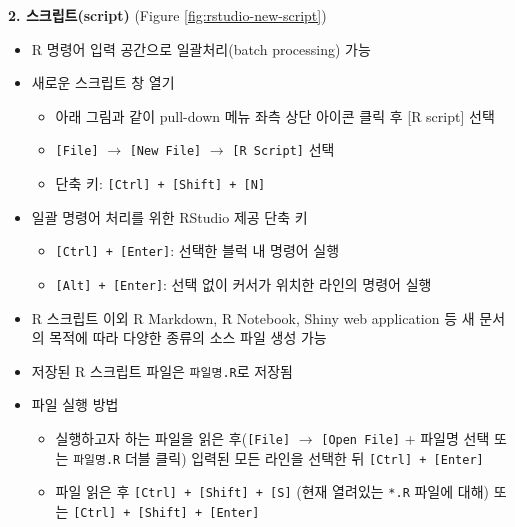 \documentclass[
  11pt,
]{krantz}
\providecommand{\tightlist}{%
  \setlength{\itemsep}{0pt}\setlength{\parskip}{0pt}}
\begin{document}
\normalsize

\textbf{2. 스크립트(script)} (Figure \ref{fig:rstudio-new-script})

\begin{itemize}
\tightlist
\item
  R 명령어 입력 공간으로 일괄처리(batch processing) 가능
\item
  새로운 스크립트 창 열기

  \begin{itemize}
  \tightlist
  \item
    아래 그림과 같이 pull-down 메뉴 좌측 상단 아이콘 클릭 후 {[}R script{]} 선택
  \item
    \texttt{{[}File{]}} \(\rightarrow\) \texttt{{[}New\ File{]}} \(\rightarrow\) \texttt{{[}R\ Script{]}} 선택
  \item
    단축 키: \texttt{{[}Ctrl{]}\ +\ {[}Shift{]}\ +\ {[}N{]}}
  \end{itemize}
\item
  일괄 명령어 처리를 위한 RStudio 제공 단축 키

  \begin{itemize}
  \tightlist
  \item
    \texttt{{[}Ctrl{]}\ +\ {[}Enter{]}}: 선택한 블럭 내 명령어 실행
  \item
    \texttt{{[}Alt{]}\ +\ {[}Enter{]}}: 선택 없이 커서가 위치한 라인의 명령어 실행
  \end{itemize}
\item
  R 스크립트 이외 R Markdown, R Notebook, Shiny web application 등 새 문서의 목적에 따라 다양한 종류의 소스 파일 생성 가능
\item
  저장된 R 스크립트 파일은 \texttt{파일명.R}로 저장됨
\item
  파일 실행 방법

  \begin{itemize}
  \tightlist
  \item
    실행하고자 하는 파일을 읽은 후(\texttt{{[}File{]}} \(\rightarrow\) \texttt{{[}Open\ File{]}} + 파일명 선택 또는 \texttt{파일명.R} 더블 클릭) 입력된 모든 라인을 선택한 뒤 \texttt{{[}Ctrl{]}\ +\ {[}Enter{]}}
  \item
    파일 읽은 후 \texttt{{[}Ctrl{]}\ +\ {[}Shift{]}\ +\ {[}S{]}} (현재 열려있는 \texttt{*.R} 파일에 대해) 또는 \texttt{{[}Ctrl{]}\ +\ {[}Shift{]}\ +\ {[}Enter{]}}
  \end{itemize}
\end{itemize}

\footnotesize
\end{document}
